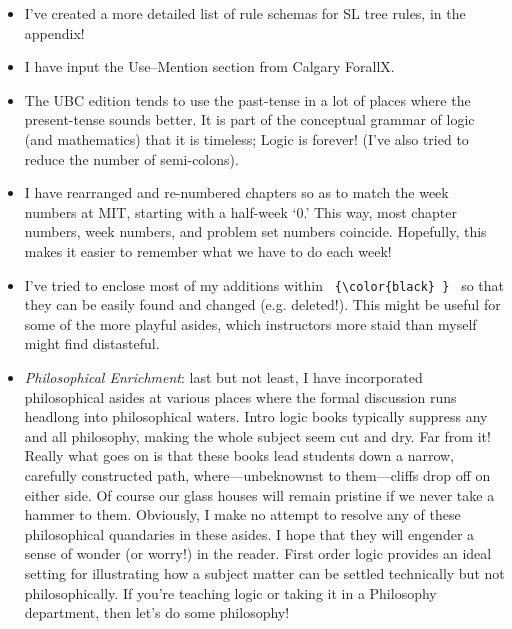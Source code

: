 \begin{itemize}
\item I've created a more detailed list of rule schemas for SL tree rules, in the appendix! 

\item I have input the Use--Mention section from Calgary ForallX.

\item The UBC edition tends to use the past-tense in a lot of places where the present-tense sounds better. It is part of the conceptual grammar of logic (and mathematics) that it is timeless; Logic is forever! (I've also tried to reduce the number of semi-colons). 

\item I have rearranged and re-numbered chapters so as to match the week numbers at MIT, starting with a half-week `0.' This way, most chapter numbers, week numbers, and problem set numbers coincide. Hopefully, this makes it easier to remember what we have to do each week!

\item I've tried to enclose most of my additions within \verb| {\color{black} } | so that they can be easily found and changed (e.g. deleted!). This might be useful for some of the more playful asides, which instructors more staid than myself might find distasteful. 

\item \textit{Philosophical Enrichment}: last but not least, I have incorporated philosophical asides at various places where the formal discussion runs headlong into philosophical waters. Intro logic books typically suppress any and all philosophy, making the whole subject seem cut and dry. Far from it! Really what goes on is that these books lead students down a narrow, carefully constructed path, where---unbeknownst to them---cliffs drop off on either side. Of course our glass houses will remain pristine if we never take a hammer to them. Obviously, I make no attempt to resolve any of these philosophical quandaries in these asides. I hope that they will engender a sense of wonder (or worry!) in the reader. First order logic provides an ideal setting for illustrating how a subject matter can be settled technically but not philosophically. If you're teaching logic or taking it in a Philosophy department, then let's do some philosophy! 



\end{itemize}

